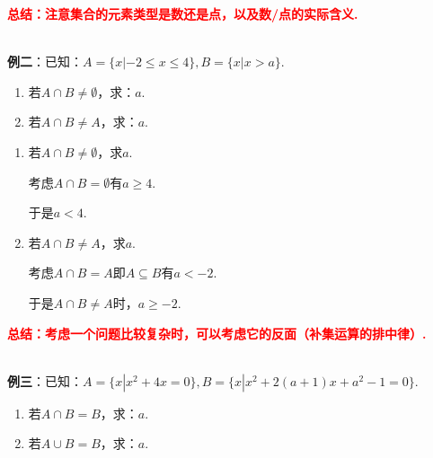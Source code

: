 \documentclass[8pt]{article}
\begin{document}
				\textcolor{red}{\textbf{总结：注意集合的元素类型是数还是点，以及数/点的实际含义.}}

				~\\

				\textbf{例二}：已知：$A=\{x|-2\leq x\leq4\}, B=\{x|x>a\}.$

				\begin{enumerate}[label=(\arabic*)]
					\item 若$A\cap B\neq\emptyset$，求：$a$.

					\item 若$A\cap B\neq A$，求：$a$.
				\end{enumerate}

				\begin{enumerate}[label=(\arabic*)]
					\item 若$A\cap B\neq\emptyset$，求$a$.

						考虑$A\cap B=\emptyset$有$a\geq 4$.

						于是$a<4$.

					\item 若$A\cap B\neq A$，求$a$.

						考虑$A\cap B=A$即$A\subseteq B$有$a<-2$.

						于是$A\cap B\neq A$时，$a\geq -2$.

				\end{enumerate}

				\textcolor{red}{\textbf{总结：考虑一个问题比较复杂时，可以考虑它的反面（补集运算的排中律）.}}

				~\\

				\textbf{例三}：已知：$A=\{x|x^2+4x=0\}, B=\{x|x^2+2(a+1)x+a^2-1=0\}.$

				\begin{enumerate}[label=(\arabic*)]
					\item 若$A\cap B=B$，求：$a$.

					\item 若$A\cup B=B$，求：$a$.
				\end{enumerate}
\end{document}
